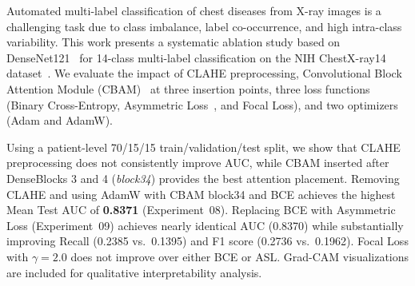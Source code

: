 Automated multi-label classification of chest diseases from X-ray images is a challenging task due to class imbalance, label co-occurrence, and high intra-class variability.
This work presents a systematic ablation study based on DenseNet121~\cite{rajpurkar2017chexnet} for 14-class multi-label classification on the NIH ChestX-ray14 dataset~\cite{wang2017chestxray14}.
We evaluate the impact of CLAHE preprocessing, Convolutional Block Attention Module (CBAM)~\cite{woo2018cbam} at three insertion points, three loss functions (Binary Cross-Entropy, Asymmetric Loss~\cite{ridnik2021asl}, and Focal Loss), and two optimizers (Adam and AdamW).

Using a patient-level 70/15/15 train/validation/test split, we show that CLAHE preprocessing does not consistently improve AUC, while CBAM inserted after DenseBlocks 3 and 4 (\textit{block34}) provides the best attention placement.
Removing CLAHE and using AdamW with CBAM block34 and BCE achieves the highest Mean Test AUC of \textbf{0.8371} (Experiment~08).
Replacing BCE with Asymmetric Loss (Experiment~09) achieves nearly identical AUC (0.8370) while substantially improving Recall (0.2385 vs.\ 0.1395) and F1 score (0.2736 vs.\ 0.1962).
Focal Loss with $\gamma{=}2.0$ does not improve over either BCE or ASL.
Grad-CAM visualizations are included for qualitative interpretability analysis.
